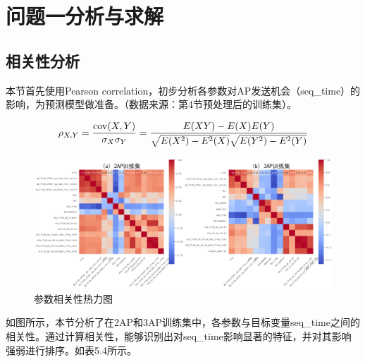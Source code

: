 \section{问题一分析与求解}
\subsection{相关性分析}\label{问题一分析}

本节首先使用Pearson correlation，初步分析各参数对AP发送机会（seq\_time）的影响，为预测模型做准备。（数据来源：第4节预处理后的训练集）。


\begin{equation}
	\small
	\rho_{X, Y} = \frac{\operatorname{cov}(X, Y)}{\sigma_{X} \sigma_{Y}} = \frac{E(X Y) - E(X) E(Y)}{\sqrt{E(X^{2}) - E^{2}(X)} \sqrt{E(Y^{2}) - E^{2}(Y)}}
\end{equation}


\begin{figure}[H]
	\centering
	\includegraphics[width=1\linewidth]{figures/问题一热力图}
	\caption{参数相关性热力图}
	\label{fig:}
\end{figure}


如图所示，本节分析了在2AP和3AP训练集中，各参数与目标变量seq\_time之间的相关性。通过计算相关性，能够识别出对seq\_time影响显著的特征，并对其影响强弱进行排序。如表5.4所示。

